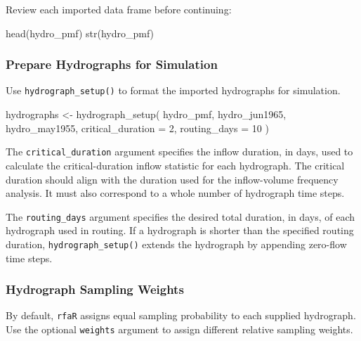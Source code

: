 \documentclass[
  letterpaper,
  DIV=11,
  numbers=noendperiod]{scrreprt}
\newenvironment{Shaded}{\begin{snugshade}}{\end{snugshade}}
\newcommand{\AttributeTok}[1]{\textcolor[rgb]{0.40,0.45,0.13}{#1}}
\newcommand{\DecValTok}[1]{\textcolor[rgb]{0.68,0.00,0.00}{#1}}
\newcommand{\FunctionTok}[1]{\textcolor[rgb]{0.28,0.35,0.67}{#1}}
\newcommand{\NormalTok}[1]{\textcolor[rgb]{0.00,0.23,0.31}{#1}}
\newcommand{\OtherTok}[1]{\textcolor[rgb]{0.00,0.23,0.31}{#1}}
\begin{document}
Review each imported data frame before continuing:

\begin{Shaded}
\begin{Highlighting}[]
\FunctionTok{head}\NormalTok{(hydro\_pmf)}
\FunctionTok{str}\NormalTok{(hydro\_pmf)}
\end{Highlighting}
\end{Shaded}

\subsubsection{Prepare Hydrographs for
Simulation}\label{prepare-hydrographs-for-simulation}

Use \texttt{hydrograph\_setup()} to format the imported hydrographs for
simulation.

\begin{Shaded}
\begin{Highlighting}[]
\NormalTok{hydrographs }\OtherTok{\textless{}{-}} \FunctionTok{hydrograph\_setup}\NormalTok{(}
\NormalTok{  hydro\_pmf,}
\NormalTok{  hydro\_jun1965,}
\NormalTok{  hydro\_may1955,}
  \AttributeTok{critical\_duration =} \DecValTok{2}\NormalTok{,}
  \AttributeTok{routing\_days =} \DecValTok{10}
\NormalTok{)}
\end{Highlighting}
\end{Shaded}

The \texttt{critical\_duration} argument specifies the inflow duration,
in days, used to calculate the critical-duration inflow statistic for
each hydrograph. The critical duration should align with the duration
used for the inflow-volume frequency analysis. It must also correspond
to a whole number of hydrograph time steps.

The \texttt{routing\_days} argument specifies the desired total
duration, in days, of each hydrograph used in routing. If a hydrograph
is shorter than the specified routing duration,
\texttt{hydrograph\_setup()} extends the hydrograph by appending
zero-flow time steps.

\subsubsection{Hydrograph Sampling
Weights}\label{hydrograph-sampling-weights}

By default, \texttt{rfaR} assigns equal sampling probability to each
supplied hydrograph. Use the optional \texttt{weights} argument to
assign different relative sampling weights.
\end{document}
